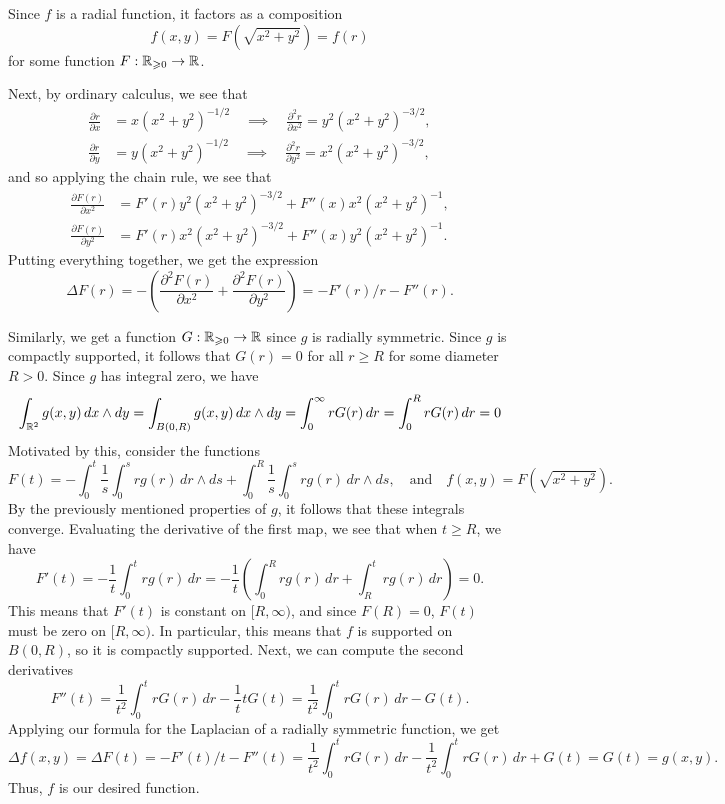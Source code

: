 \documentclass[expanded]{lkx_pset}
\begin{document}
\begin{solution}
	Since $f$ is a radial function, it factors as a composition
	\[
		f(x,y) = F\left(\sqrt{x^2+y^2}\right)=f(r)
	\]
	for some function $F : \mathbb{R}_{\geqslant 0} \to \mathbb{R}$.

	Next, by ordinary calculus, we see that
	\[
		\begin{aligned}
			\frac{\partial r}{\partial x} & = x(x^2+y^2)^{-1/2}\quad\implies\quad\frac{\partial^2 r}{\partial x^2} = y^2(x^2+y^2)^{-3/2}, \\
			\frac{\partial r}{\partial y} & = y(x^2+y^2)^{-1/2}\quad\implies\quad\frac{\partial^2 r}{\partial y^2} = x^2(x^2+y^2)^{-3/2},
		\end{aligned}
	\]
	and so applying the chain rule, we see that
	\[
		\begin{aligned}
			\frac{\partial F(r)}{\partial x^2} & = F'(r)y^2(x^2+y^2)^{-3/2}+F''(x)x^2(x^2+y^2)^{-1}, \\
			\frac{\partial F(r)}{\partial y^2} & = F'(r)x^2(x^2+y^2)^{-3/2}+F''(x)y^2(x^2+y^2)^{-1}.
		\end{aligned}
	\]
	Putting everything together, we get the expression
	\[
		\Delta F(r) = -\left(\frac{\partial^2F(r)}{\partial x^2} + \frac{\partial^2 F(r)}{\partial y^2}\right) = -F'(r)/r - F''(r).
	\]

	Similarly, we get a function $G : \mathbb{R}_{\geqslant 0} \to \mathbb{R}$ since $g$ is radially symmetric. Since $g$ is compactly supported, it follows that $G(r)=0$ for all $r\geq R$ for some diameter $R>0$. Since $g$ has integral zero, we have
	\[
		\int_{\mathbb{R}^2} g(x,y)\,dx\wedge dy = \int_{B(0, R)} g(x,y)\,dx\wedge dy = \int_0^\infty r G(r)\,dr = \int_0^R rG(r)\,dr = 0
	\]
	Motivated by this, consider the functions
	\[
		F(t) = -\int_0^t \frac{1}{s}\int_0^s rg(r)\,dr\wedge ds + \int_0^R\frac{1}{s}\int_0^s rg(r)\,dr\wedge ds,\quad\textrm{and}\quad f(x,y)=F(\sqrt{x^2+y^2}).
	\]
	By the previously mentioned properties of $g$, it follows that these integrals converge. Evaluating the derivative of the first map, we see that when $t\geq R$, we have
	\[
		F'(t) = -\frac{1}{t}\int_0^t rg(r)\,dr = -\frac{1}{t}\left(\int_0^R rg(r)\,dr + \int_R^t rg(r)\,dr\right)=0.
	\]
	This means that $F'(t)$ is constant on $[R,\infty)$, and since $F(R) = 0$, $F(t)$ must be zero on $[R,\infty)$. In particular, this means that $f$ is supported on $B(0,R)$, so it is compactly supported. Next, we can compute the second derivatives
	\[
		F''(t) = \frac{1}{t^2}\int_0^t rG(r)\,dr - \frac{1}{t}tG(t) = \frac{1}{t^2}\int_0^t rG(r)\,dr - G(t).
	\]
	Applying our formula for the Laplacian of a radially symmetric function, we get
	\[
		\Delta f(x,y) = \Delta F(t) = -F'(t)/t - F''(t) = \frac{1}{t^2}\int_0^t rG(r)\,dr - \frac{1}{t^2}\int_0^t rG(r)\,dr + G(t) = G(t) = g(x,y).
	\]
	Thus, $f$ is our desired function.
\end{solution}
\end{document}
